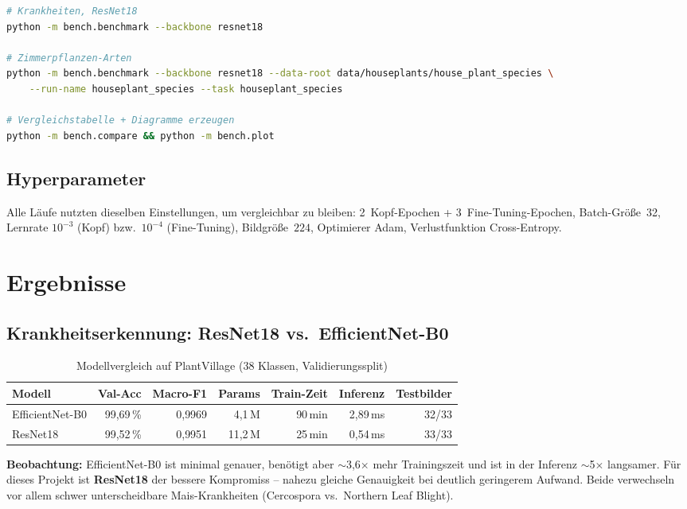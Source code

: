 \documentclass[11pt,a4paper]{article}
\begin{document}
\begin{lstlisting}[language=bash, numbers=none, caption={Beispielaufrufe}]
# Krankheiten, ResNet18
python -m bench.benchmark --backbone resnet18

# Zimmerpflanzen-Arten
python -m bench.benchmark --backbone resnet18 --data-root data/houseplants/house_plant_species \
    --run-name houseplant_species --task houseplant_species

# Vergleichstabelle + Diagramme erzeugen
python -m bench.compare && python -m bench.plot
\end{lstlisting}

\subsection{Hyperparameter}
Alle Läufe nutzten dieselben Einstellungen, um vergleichbar zu bleiben:
2~Kopf-Epochen + 3~Fine-Tuning-Epochen, Batch-Größe~32, Lernrate
$10^{-3}$ (Kopf) bzw.\ $10^{-4}$ (Fine-Tuning), Bildgröße~$224$, Optimierer
Adam, Verlustfunktion Cross-Entropy.

\section{Ergebnisse}

\subsection{Krankheitserkennung: ResNet18 vs.\ EfficientNet-B0}
\begin{table}[h]
\centering
\caption{Modellvergleich auf PlantVillage (38 Klassen, Validierungssplit)}
\label{tab:crop}
\small
\begin{tabular}{@{}lrrrrrr@{}}
\toprule
\textbf{Modell} & \textbf{Val-Acc} & \textbf{Macro-F1} & \textbf{Params} & \textbf{Train-Zeit} & \textbf{Inferenz} & \textbf{Testbilder} \\
\midrule
EfficientNet-B0 & 99{,}69\,\% & 0{,}9969 & 4{,}1\,M & 90\,min & 2{,}89\,ms & 32/33 \\
ResNet18        & 99{,}52\,\% & 0{,}9951 & 11{,}2\,M & 25\,min & 0{,}54\,ms & 33/33 \\
\bottomrule
\end{tabular}
\end{table}

\noindent
\textbf{Beobachtung:} EfficientNet-B0 ist minimal genauer, benötigt aber
$\sim$3{,}6$\times$ mehr Trainingszeit und ist in der Inferenz $\sim$5$\times$
langsamer. Für dieses Projekt ist \textbf{ResNet18} der bessere Kompromiss --
nahezu gleiche Genauigkeit bei deutlich geringerem Aufwand. Beide verwechseln vor
allem schwer unterscheidbare Mais-Krankheiten (Cercospora vs.\ Northern Leaf
Blight).
\end{document}
